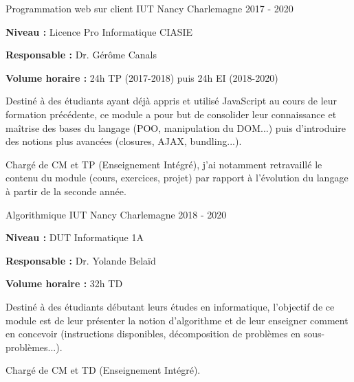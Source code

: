 \documentclass[12pt, a4paper]{awesome-cv}
\begin{document}
\begin{cventries}

  \cventry
  {Programmation web sur client} %
  {IUT Nancy Charlemagne} %
  {} %
  {2017 - 2020} %
  {
    \begin{cvitems}
      \item {\textbf{Niveau : } Licence Pro Informatique CIASIE}
      \item {\textbf{Responsable : } Dr. Gérôme Canals}
      \item {\textbf{Volume horaire : } 24h TP (2017-2018) puis 24h EI (2018-2020)}
    \end{cvitems}
  }

  \begin{cvparagraph}
    Destiné à des étudiants ayant déjà appris et utilisé JavaScript au cours de leur formation précédente, ce module a pour but de consolider leur connaissance et maîtrise des bases du langage (POO, manipulation du DOM...) puis d'introduire des notions plus avancées (closures, AJAX, bundling...).
  \end{cvparagraph}

  \begin{cvparagraph}
    Chargé de CM et TP (Enseignement Intégré), j'ai notamment retravaillé le contenu du module (cours, exercices, projet) par rapport à l'évolution du langage à partir de la seconde année.
  \end{cvparagraph}

  \cventry
  {Algorithmique} %
  {IUT Nancy Charlemagne} %
  {} %
  {2018 - 2020} %
  {
    \begin{cvitems}
      \item {\textbf{Niveau : } DUT Informatique 1A}
      \item {\textbf{Responsable : } Dr. Yolande Belaïd}
      \item {\textbf{Volume horaire : } 32h TD}
    \end{cvitems}
  }

  \begin{cvparagraph}
    Destiné à des étudiants débutant leurs études en informatique, l'objectif de ce module est de leur présenter la notion d'algorithme et de leur enseigner comment en concevoir (instructions disponibles, décomposition de problèmes en sous-problèmes...).
  \end{cvparagraph}

  \begin{cvparagraph}
    Chargé de CM et TD (Enseignement Intégré).
  \end{cvparagraph}


\end{cventries}
\end{document}
